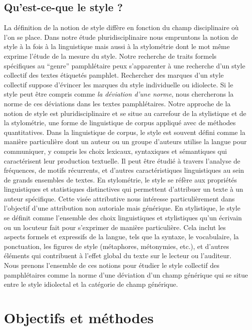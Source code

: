 \section{Qu'est-ce-que le style ?}

La définition de la notion de style diffère en fonction du champ disciplinaire où l'on se place. Dans notre étude pluridisciplinaire nous empruntons la notion de style à la fois à la linguistique mais aussi à la stylométrie dont le mot même exprime l'étude de la mesure du style.
Notre recherche de traits formels spécifiques au \enquote{genre} pamphlétaire peux s'apparenter à une recherche d'un style collectif des textes étiquetés pamphlet. Rechercher des marques d'un style collectif suppose d'évincer les marques du style individuelle ou idiolecte. Si le style peut être compris comme \textit{la déviation d'une norme}, nous chercherons la norme de ces déviations dans les textes pamphlétaires. Notre approche de la notion de style est pluridisciplinaire et se situe au carrefour de la stylistique et de la stylométrie, une forme de linguistique de corpus appliqué avec de méthodes quantitatives. Dans la linguistique de corpus, le style est souvent défini comme la manière particulière dont un auteur ou un groupe d'auteurs utilise la langue pour communiquer, y compris les choix lexicaux, syntaxiques et sémantiques qui caractérisent leur production textuelle. Il peut être étudié à travers l'analyse de fréquences, de motifs récurrents, et d'autres caractéristiques linguistiques au sein de grands ensembles de textes. En stylométrie, le style se réfère aux propriétés linguistiques et statistiques distinctives qui permettent d'attribuer un texte à un auteur spécifique. Cette visée attributive nous intéresse particulièrement dans l'objectif d'une attribution non autoriale mais générique. En stylistique, le style se définit comme l'ensemble des choix linguistiques et stylistiques qu'un écrivain ou un locuteur fait pour s'exprimer de manière particulière. Cela inclut les aspects formels et expressifs de la langue, tels que la syntaxe, le vocabulaire, la ponctuation, les figures de style (métaphores, métonymies, etc.), et d'autres éléments qui contribuent à l'effet global du texte sur le lecteur ou l'auditeur. Nous prenons l'ensemble de ces notions pour étudier le style collectif des pamphlétaires comme la norme d'une déviation d'un champ générique qui se situe entre le style idiolectal et la catégorie de champ générique. 


\chapter{Objectifs et méthodes}

